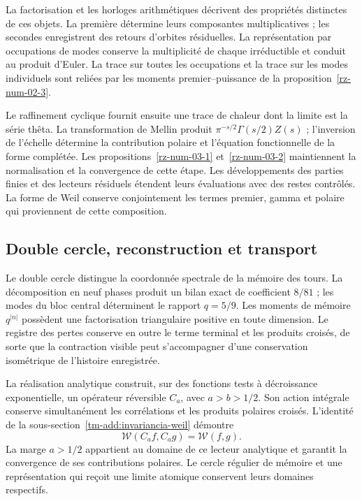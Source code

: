La factorisation et les horloges arithmétiques décrivent des propriétés distinctes de ces objets. La première détermine leurs composantes multiplicatives ; les secondes enregistrent des retours d'orbites résiduelles. La représentation par occupations de modes conserve la multiplicité de chaque irréductible et conduit au produit d'Euler. La trace sur toutes les occupations et la trace sur les modes individuels sont reliées par les moments premier--puissance de la proposition~\ref{rz-num-02-3}.

Le raffinement cyclique fournit ensuite une trace de
chaleur dont la limite est la série thêta. La transformation de Mellin
produit $\pi^{-s/2}\Gamma(s/2)Z(s)$ ; l’inversion de l’échelle
détermine la contribution polaire et l’équation fonctionnelle de la
forme complétée. Les propositions~\ref{rz-num-03-1}
et~\ref{rz-num-03-2} maintiennent la normalisation et la convergence
de cette étape. Les développements des parties finies et des lecteurs
résiduels étendent leurs évaluations avec des restes contrôlés.
La forme de Weil conserve conjointement les termes premier,
gamma et polaire qui proviennent de cette composition.

\subsection*{Double cercle, reconstruction et transport}

Le double cercle distingue la coordonnée spectrale de la mémoire
des tours. La décomposition en neuf phases produit un bilan
exact de coefficient $8/81$ ; les modes du bloc central
déterminent le rapport $q=5/9$. Les moments de mémoire
$q^{|n|}$ possèdent une factorisation triangulaire positive en toute
dimension. Le registre des pertes conserve en outre le terme
terminal et les produits croisés, de sorte que la contraction
visible peut s’accompagner d’une conservation isométrique de
l’histoire enregistrée.

La réalisation analytique construit, sur des fonctions tests à décroissance exponentielle, un opérateur réversible $C_a$, avec $a>b>1/2$. Son action intégrale conserve simultanément les corrélations et les produits polaires croisés. L'identité de la sous-section~\ref{tm-add:invariancia-weil} démontre
\[
\mathscr W(C_af,C_ag)=\mathscr W(f,g).
\]
La marge $a>1/2$ appartient au domaine de ce lecteur analytique
et garantit la convergence de ses contributions polaires.
Le cercle régulier de mémoire et une représentation qui reçoit
une limite atomique conservent leurs domaines respectifs.

